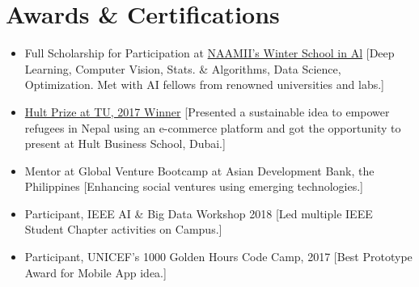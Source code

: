 \documentclass{resumex}
\begin{document}
\section{Awards \& Certifications  }
\begin{itemize}
    
\item {Full Scholarship for Participation at \href{https://1nepalschool.naamii.com.np/}{NAAMII's Winter School in Al}}
[Deep Learning, Computer Vision, Stats. \& Algorithms, Data Science, Optimization. Met with AI fellows from renowned universities and labs.] 


\item {\href{https://glocalkhabar.com/hult-prize-tu-winner-team-aegis-social-entrepreneurship/}{Hult Prize at TU, 2017 Winner}}
[Presented a sustainable idea to empower refugees in Nepal using an e-commerce platform and got the opportunity to present at Hult Business School, Dubai.]

\item {Mentor at Global Venture Bootcamp at Asian Development Bank, the Philippines}
[Enhancing social ventures using emerging technologies.]

\item {Participant, IEEE AI \& Big Data Workshop 2018}
[Led multiple IEEE Student Chapter activities on Campus.]

\item{Participant, UNICEF's 1000 Golden Hours Code Camp, 2017}
[Best Prototype Award for Mobile App idea.]
\end{itemize}

\vspace{5mm}
\end{document}
